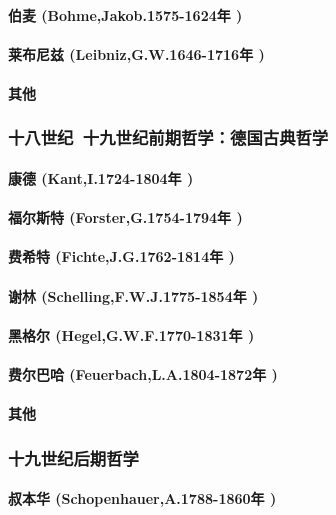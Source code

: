 \documentclass[UTF8]{../RepresentationUniverse}
\begin{document}
    \paragraph{伯麦 (Bohme,Jakob.1575-1624年 )}
    \paragraph{莱布尼兹 (Leibniz,G.W.1646-1716年 )}
    \paragraph{其他}
\subsubsection{十八世纪~十九世纪前期哲学：德国古典哲学}
    \paragraph{康德 (Kant,I.1724-1804年 )}
    \paragraph{福尔斯特 (Forster,G.1754-1794年 )}
    \paragraph{费希特 (Fichte,J.G.1762-1814年 )}
    \paragraph{谢林 (Schelling,F.W.J.1775-1854年 )}
    \paragraph{黑格尔 (Hegel,G.W.F.1770-1831年 )}
    \paragraph{费尔巴哈 (Feuerbach,L.A.1804-1872年 )}
    \paragraph{其他}

\subsubsection{十九世纪后期哲学}
    \paragraph{叔本华 (Schopenhauer,A.1788-1860年 )}
\end{document}
